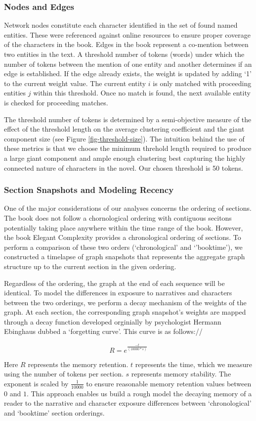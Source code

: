 \subsubsection{Nodes and Edges}
Network nodes constitute each character identified in the set of found named entities. These were referenced against online resources to ensure proper coverage of the characters in the book. Edges in the book represent a co-mention between two entities in the text. A threshold number of tokens (words) under which the number of tokens between the mention of one entity and another determines if an edge is established. If the edge already exists, the weight is updated by adding `1' to the current weight value. The current entity $i$ is only matched with proceeding entities $j$ within this threshold. Once no match is found, the next available entity is checked for proceeding matches.

The threshold number of tokens is determined by a semi-objective measure of the effect of the threshold length on the average clustering coefficient and the giant component size (see Figure \ref{fig-threshold-size}). The intuition behind the use of these metrics is that we choose the minimum threhold length required to produce a large giant component and ample enough clustering best capturing the highly connected nature of characters in the novel. Our chosen threshold is 50 tokens.

\subsubsection{Section Snapshots and Modeling Recency}
One of the major considerations of our analyses concerns the ordering of sections. The book does not follow a chornological ordering with contiguous secitons potentially taking place anywhere within the time range of the book. However, the book Elegant Complexity \cite{carlisle_2007} provides a chronological ordering of sections. To perform a comparison of these two orders (`chronological' and `'booktime'), we constructed a timelapse of graph snapshots that represents the aggregate graph structure up to the current section in the given ordering. 

Regardless of the ordering, the graph at the end of each sequence will be identical. To model the differences in exposure to narratives and characters between the two orderings, we perform a decay mechanism of the weights of the graph. At each section, the corresponding graph snapshot's weights are mapped through a decay function developed orginially by psychologist Hermann Ebinghaus dubbed a `forgetting curve'. This curve is as follows://


\begin{equation*}
    R = e^{\frac{-t}{(10000*s)}}
\end{equation*}


Here $R$ represents the memory retention. $t$ represents the time, which we measure using the number of tokens per section. $s$ represents memory stability. The exponent is scaled by $\frac{1}{10000}$ to ensure reasonable memory retention values between $0$ and $1$. This approach enables us build a rough model the decaying memory of a reader to the narrative and character exposure differences between `chronological' and `booktime' section orderings.